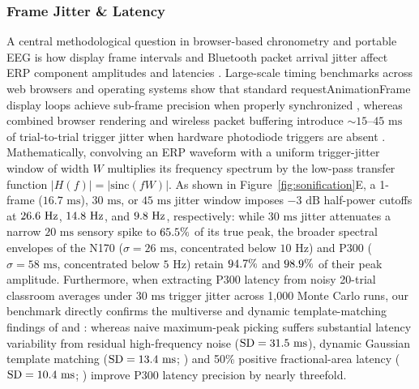 \documentclass[11pt]{article}
\begin{document}
\subsubsection{Frame Jitter \& Latency}
A central methodological question in browser-based chronometry and portable EEG is how display frame intervals and Bluetooth packet arrival jitter affect ERP component amplitudes and latencies \citep{pronk2020mental,anwyl2021realistic,lukacs2023precise,schubert2024multiverse,schubert2026dynamic}. Large-scale timing benchmarks across web browsers and operating systems show that standard requestAnimationFrame display loops achieve sub-frame precision when properly synchronized \citep{pronk2020mental,lukacs2023precise}, whereas combined browser rendering and wireless packet buffering introduce $\sim 15\text{--}45\text{ ms}$ of trial-to-trial trigger jitter when hardware photodiode triggers are absent \citep{anwyl2021realistic,krigolson2017choosing}. Mathematically, convolving an ERP waveform with a uniform trigger-jitter window of width $W$ multiplies its frequency spectrum by the low-pass transfer function $|H(f)| = |\text{sinc}(fW)|$. As shown in Figure~\ref{fig:sonification}E, a 1-frame ($16.7\text{ ms}$), $30\text{ ms}$, or $45\text{ ms}$ jitter window imposes $-3\text{ dB}$ half-power cutoffs at $26.6\text{ Hz}$, $14.8\text{ Hz}$, and $9.8\text{ Hz}$, respectively: while $30\text{ ms}$ jitter attenuates a narrow $20\text{ ms}$ sensory spike to $65.5\%$ of its true peak, the broader spectral envelopes of the N170 ($\sigma = 26\text{ ms}$, concentrated below $10\text{ Hz}$) and P300 ($\sigma = 58\text{ ms}$, concentrated below $5\text{ Hz}$) retain $94.7\%$ and $98.9\%$ of their peak amplitude. Furthermore, when extracting P300 latency from noisy 20-trial classroom averages under $30\text{ ms}$ trigger jitter across 1,000 Monte Carlo runs, our benchmark directly confirms the multiverse and dynamic template-matching findings of \citet{schubert2024multiverse} and \citet{schubert2026dynamic}: whereas naive maximum-peak picking suffers substantial latency variability from residual high-frequency noise ($\text{SD} = 31.5\text{ ms}$), dynamic Gaussian template matching ($\text{SD} = 13.4\text{ ms}$; \citealp{schubert2026dynamic}) and 50\% positive fractional-area latency ($\text{SD} = 10.4\text{ ms}$; \citealp{schubert2024multiverse}) improve P300 latency precision by nearly threefold.
\end{document}
